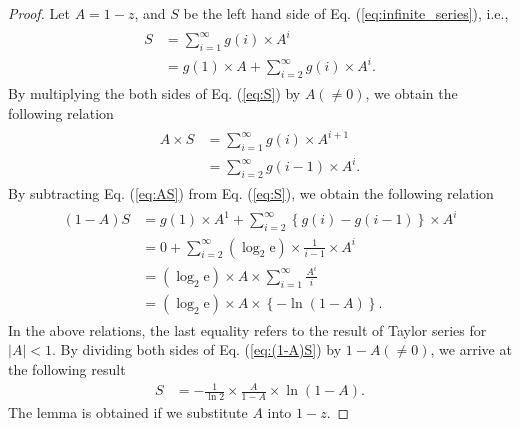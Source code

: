 \begin{proof}

Let $A=1-z$, and $S$ be the left hand side of Eq. (\ref{eq:infinite_series}), i.e.,
\begin{align}\begin{split}\label{eq:S}
	S &= \sum_{i=1}^{\infty} g(i) \times A^i \\
    &= g(1)\times A +  \sum_{i=2}^{\infty} g(i) \times A^{i}.
\end{split}\end{align}
By multiplying the both sides of Eq. (\ref{eq:S}) by $A(\neq 0)$, we obtain the following relation
\begin{align}\begin{split}\label{eq:AS}
	A\times S &= \sum_{i=1}^{\infty} g(i) \times A^{i+1} \\
  &= \sum_{i=2}^{\infty} g(i-1) \times A^{i}.
\end{split}\end{align}
By subtracting Eq. (\ref{eq:AS}) from Eq. (\ref{eq:S}), we obtain the following relation
\begin{align}\begin{split}\label{eq:(1-A)S}
	(1-A)S &= g(1)\times A^{1} + \sum_{i=2}^{\infty} \left\{ g(i)-g(i-1) \right\} \times A^{i} \\
	&=0 + \sum_{i=2}^{\infty} (\log_2 \mathrm{e}) \times \frac{1}{i-1} \times A^{i} \\
	&=(\log_2 \mathrm{e})\times A \times \sum_{i=1}^{\infty} \frac{A^{i}}{i} \\
	&=(\log_2 \mathrm{e})\times A \times \left\{ - \ln (1-A) \right\}.
\end{split}\end{align}
In the above relations, the last equality refers to the result of Taylor series for $|A| < 1$.
By dividing both sides of Eq. (\ref{eq:(1-A)S}) by $1-A (\neq 0)$, we arrive at the following result
\begin{align}
	S &= -\frac{1}{\ln 2} \times \frac{A}{1-A} \times \ln (1-A).
\end{align}
The lemma is obtained if we substitute $A$ into $1-z$.
\end{proof}
